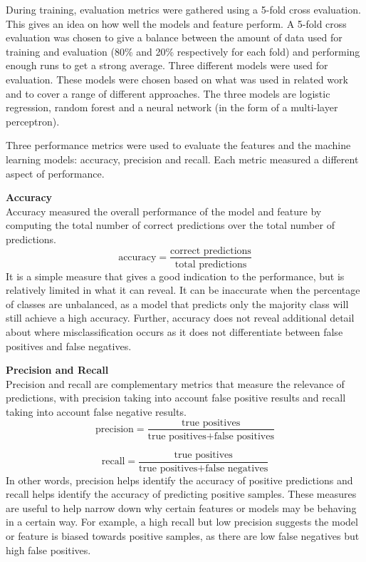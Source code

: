 \documentclass[Report.tex]{subfiles}
\begin{document}
During training, evaluation metrics were gathered using a 5-fold cross evaluation. This gives an idea on how well the models and feature perform. A 5-fold cross evaluation was chosen to give a balance between the amount of data used for training and evaluation (80\% and 20\% respectively for each fold) and performing enough runs to get a strong average. Three different models were used for evaluation. These models were chosen based on what was used in related work \cite{starcraft-identification, dota-gao, dota-eggert, mouse-dynamics} and to cover a range of different approaches. The three models are logistic regression, random forest and a neural network (in the form of a multi-layer perceptron).

Three performance metrics were used to evaluate the features and the machine learning models: accuracy, precision and recall. Each metric measured a different aspect of performance. 

\textbf{Accuracy} \\
Accuracy measured the overall performance of the model and feature by computing the total number of correct predictions over the total number of predictions.
\begin{equation*}
\text{accuracy} = \frac{\text{correct predictions}}{\text{total predictions}}
\end{equation*}
It is a simple measure that gives a good indication to the performance, but is relatively limited in what it can reveal. It can be inaccurate when the percentage of classes are unbalanced, as a model that predicts only the majority class will still achieve a high accuracy. Further, accuracy does not reveal additional detail about where misclassification occurs as it does not differentiate between false positives and false negatives. 

\textbf{Precision and Recall} \\
Precision and recall are complementary metrics that measure the relevance of predictions, with precision taking into account false positive results and recall taking into account false negative results. 
\begin{equation*}
\text{precision} = \frac{\text{true positives}}{\text{true positives} + \text{false positives}}
\end{equation*}

\begin{equation*}
\text{recall} = \frac{\text{true positives}}{\text{true positives} + \text{false negatives}}
\end{equation*}
In other words, precision helps identify the accuracy of positive predictions and recall helps identify the accuracy of predicting positive samples. These measures are useful to help narrow down why certain features or models may be behaving in a certain way. For example, a high recall but low precision suggests the model or feature is biased towards positive samples, as there are low false negatives but high false positives. 
\end{document}
